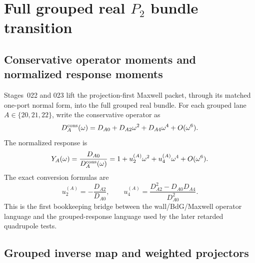 \section{Full grouped real \texorpdfstring{\(P_2\)}{P2} bundle transition}
\label{sec:part01_parent_geometry:full-grouped-real-p-2-bundle-transition}

\subsection{Conservative operator moments and normalized response moments}
\label{subsec:part01-operator-to-response}

Stages~022 and 023 lift the projection-first Maxwell packet, through its matched one-port normal form, into the full grouped real bundle.  For each grouped lane \(A\in\{20,21,22\}\), write the conservative operator as
\begin{equation}
\label{eq:part01-DA-cons-expansion}
D_A^{\rm cons}(\omega)
=
D_{A0}+D_{A2}\omega^2+D_{A4}\omega^4+O(\omega^6).
\end{equation}
The normalized response is
\begin{equation}
\label{eq:part01-Y-A-response}
Y_A(\omega)
=
\frac{D_{A0}}{D_A^{\rm cons}(\omega)}
=
1+u_2^{(A)}\omega^2+u_4^{(A)}\omega^4+O(\omega^6).
\end{equation}
The exact conversion formulas are
\begin{equation}
\label{eq:part01-u2-u4-conversion}
\boxed{
u_2^{(A)}=-\frac{D_{A2}}{D_{A0}},
\qquad
u_4^{(A)}=\frac{D_{A2}^2-D_{A0}D_{A4}}{D_{A0}^2}}.
\end{equation}
This is the first bookkeeping bridge between the wall/BdG/Maxwell operator language and the grouped-response language used by the later retarded quadrupole tests.

\subsection{Grouped inverse map and weighted projectors}
\label{subsec:part01-weighted-projectors}

